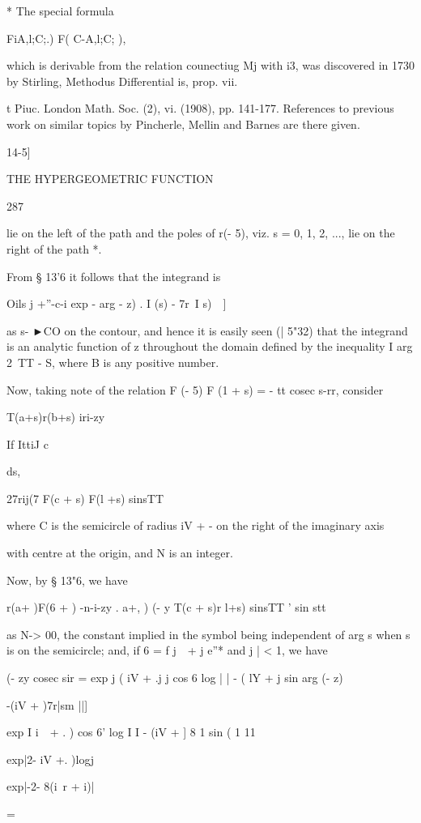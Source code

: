 * The special formula

FiA,l;C;.) F( C-A,l;C; ),

which is derivable from the relation counectiug Mj with i3, was
discovered in 1730 by Stirling, Methodus Differential is, prop. vii.

t Piuc. London Math. Soc. (2), vi. (1908), pp. 141-177. References to
previous work on similar topics by Pincherle, Mellin and Barnes are
there given.

14-5]

THE HYPERGEOMETRIC FUNCTION

287

lie on the left of the path and the poles of r(- 5), viz. s = 0, 1, 2,
..., lie on the right of the path *.

From § 13'6 it follows that the integrand is

Oils j +''-c-i exp - arg - z) . I (s) - 7r\ I s)\ \ ]

as s- ►CO on the contour, and hence it is easily seen (| 5"32) that
the integrand is an analytic function of z throughout the domain
defined by the inequality I arg 2\ TT - S, where B is any positive
number.

Now, taking note of the relation F (- 5) F (1 + s) = - tt cosec s-rr,
consider

T(a+s)r(b+s) iri-zy

If IttiJ c

ds,

27rij(7 F(c + s) F(l +s) sinsTT

where C is the semicircle of radius iV + - on the right of the
imaginary axis

with centre at the origin, and N is an integer.

Now, by § 13"6, we have

r(a+ )F(6 + ) -n-i-zy . a+,\,\,) (- y T(c + s)r l+s) sinsTT ' sin
stt

as N-> 00, the constant implied in the symbol being independent of
arg s when s is on the semicircle; and, if 6 = f j\ \ + j e''* and j
| < 1, we have

(- zy cosec sir = exp j ( iV + .j j cos 6 log | | - ( lY + j sin arg
(- z)

-(iV + )7r|sm ||]

exp I i\ \ + . ) cos 6' log I I - (iV + ] 8 1 sin ( 1 11

exp|2- iV +. )logj

exp|-2- 8(i\ r + i)|

=

